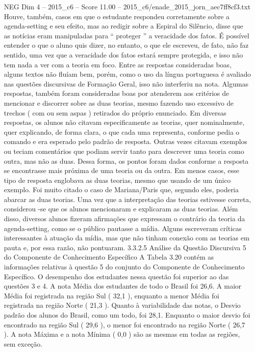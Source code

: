 \begin{textsample}{NEG Dim 4 – 2015\_c6 – Score 11.00 – 2015\_c6/enade\_2015\_jorn\_aec7ff8cf3.txt}
Houve, também, casos em que o estudante respondeu corretamente sobre a agenda-setting e seu efeito, mas ao redigir sobre a Espiral do Silêncio, disse que as notícias eram manipuladas para “ proteger ” a veracidade dos fatos.
É possível entender o que o aluno quis dizer, no entanto, o que ele escreveu, de fato, não faz sentido, uma vez que a veracidade dos fatos estará sempre protegida, e isso não tem nada a ver com a teoria em foco.
Entre as respostas consideradas boas, alguns textos não fluíam bem, porém, como o uso da língua portuguesa é avaliado nas questões discursivas de Formação Geral, isso não interferiu na nota.
Algumas respostas, também foram consideradas boas por atenderem aos critérios de mencionar e discorrer sobre as duas teorias, mesmo fazendo uso excessivo de trechos ( com ou sem aspas ) retirados do próprio enunciado.
Em diversas respostas, os alunos não citavam especificamente as teorias, quer nominalmente, quer explicando, de forma clara, o que cada uma representa, conforme pedia o comando e era esperado pelo padrão de resposta.
Outras vezes citavam exemplos ou teciam comentários que podiam servir tanto para descrever uma teoria como outra, mas não as duas.
Dessa forma, os pontos foram dados conforme a resposta se encontrasse mais próxima de uma teoria ou da outra.
Em menos casos, esse tipo de resposta englobava as duas teorias, mesmo que usando de um único exemplo.
Foi muito citado o caso de Mariana/Paris que, segundo eles, poderia abarcar as duas teorias.
Uma vez que a interpretação das teorias estivesse correta, considerou -se que os alunos mencionaram e explicaram as duas teorias.
Além disso, diversos alunos fizeram afirmações que expressam o contrário da teoria da agenda-setting, como se o público pautasse a mídia.
Alguns escreveram críticas interessantes à atuação da mídia, mas que não tinham conexão com as teorias em pauta e, por essa razão, não pontuaram. 3.3.2.5 Análise da Questão Discursiva 5 do Componente de Conhecimento Específico A Tabela 3.20 contém as informações relativas à questão 5 do conjunto do Componente de Conhecimento Específico.
O desempenho dos estudantes nessa questão foi superior ao das questões 3 e 4.
A nota Média dos estudantes de todo o Brasil foi 26,6.
A maior Média foi registrada na região Sul ( 32,1 ), enquanto a menor Média foi registrada na região Norte ( 21,3 ).
Quanto à variabilidade das notas, o Desvio padrão dos alunos do Brasil, como um todo, foi 28,1.
Enquanto o maior desvio foi encontrado na região Sul ( 29,6 ), o menor foi encontrado na região Norte ( 26,7 ).
A nota Máxima e a nota Mínima ( 0,0 ) são as mesmas em todas as regiões, sem exceção.

\end{textsample}
